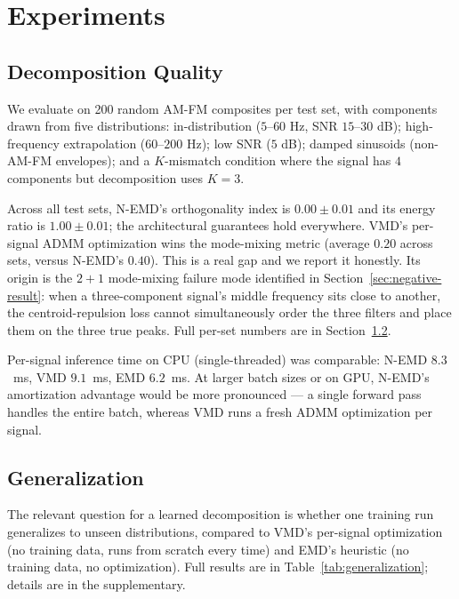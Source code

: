 \documentclass[journal]{IEEEtran}
\begin{document}
\section{Experiments}
\label{sec:experiments}

\subsection{Decomposition Quality}

We evaluate on 200 random AM-FM composites per test set, with components drawn from five distributions: in-distribution ($5$--$60$ Hz, SNR $15$--$30$ dB); high-frequency extrapolation ($60$--$200$ Hz); low SNR ($5$ dB); damped sinusoids (non-AM-FM envelopes); and a $K$-mismatch condition where the signal has $4$ components but decomposition uses $K = 3$.

Across all test sets, N-EMD's orthogonality index is $0.00 \pm 0.01$ and its energy ratio is $1.00 \pm 0.01$; the architectural guarantees hold everywhere. VMD's per-signal ADMM optimization wins the mode-mixing metric (average $0.20$ across sets, versus N-EMD's $0.40$). This is a real gap and we report it honestly. Its origin is the $2{+}1$ mode-mixing failure mode identified in Section~\ref{sec:negative-result}: when a three-component signal's middle frequency sits close to another, the centroid-repulsion loss cannot simultaneously order the three filters and place them on the three true peaks. Full per-set numbers are in Section~\ref{sec:generalization}.

Per-signal inference time on CPU (single-threaded) was comparable: N-EMD $8.3$~ms, VMD $9.1$~ms, EMD $6.2$~ms. At larger batch sizes or on GPU, N-EMD's amortization advantage would be more pronounced --- a single forward pass handles the entire batch, whereas VMD runs a fresh ADMM optimization per signal.

\subsection{Generalization}
\label{sec:generalization}

The relevant question for a learned decomposition is whether one training run generalizes to unseen distributions, compared to VMD's per-signal optimization (no training data, runs from scratch every time) and EMD's heuristic (no training data, no optimization). Full results are in Table~\ref{tab:generalization}; details are in the supplementary.
\end{document}
